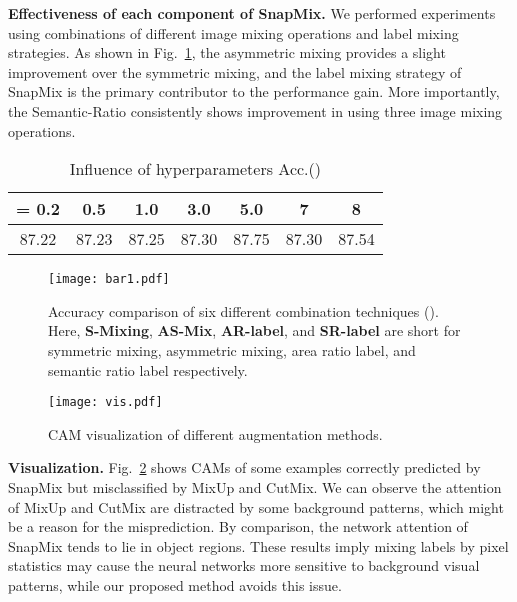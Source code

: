 \documentclass[letterpaper]{article} \usepackage{aaai21}  \usepackage{times}  \usepackage{helvet} \usepackage{courier}  \usepackage[hyphens]{url}  \usepackage{graphicx} \urlstyle{rm} \def\UrlFont{\rm}  \usepackage{natbib}  \usepackage{caption} \frenchspacing  \setlength{\pdfpagewidth}{8.5in}  \setlength{\pdfpageheight}{11in}
\begin{document}
\noindent\textbf{Effectiveness of each component of SnapMix.} We performed experiments using combinations of different image mixing operations and label mixing strategies. As shown in Fig.~\ref{fig:acc}, the asymmetric mixing provides a slight improvement over the symmetric mixing, and the label mixing strategy of SnapMix is the primary contributor to the performance gain. More importantly, the Semantic-Ratio consistently shows improvement in using three image mixing operations. 






  \begin{table}
\caption{Influence of hyperparameters Acc.()}
        \begin{center}
            \begin{tabular}{ccccccc}
            \toprule
            = 0.2&0.5 &1.0 &3.0 & 5.0 & 7&8  \\
             \midrule
             87.22 & 87.23& 87.25& 87.30&87.75 &87.30&87.54  \\
           
            
             \bottomrule
            
            
            \end{tabular}
\end{center}
        \label{table:influence}
\end{table}
  
  \begin{figure}[t]
  \begin{center}
    \texttt{[image: bar1.pdf]}
\end{center}
  \caption{Accuracy comparison of six different combination techniques (). Here, \textbf{S-Mixing}, \textbf{AS-Mix}, \textbf{AR-label}, and \textbf{SR-label}  are short for symmetric mixing, asymmetric mixing, area ratio label, and semantic ratio label respectively.}
  \label{fig:acc}
\end{figure}
  
  
  \begin{figure}[!]
  \begin{center}
    \texttt{[image: vis.pdf]}
  \end{center}
  \caption{CAM visualization of different augmentation methods.}
  \label{fig:vis}
  \vspace{-1em}
\end{figure}
  
  \noindent\textbf{Visualization.}
Fig.~\ref{fig:vis} shows CAMs of some examples correctly predicted by SnapMix but misclassified by MixUp and CutMix. We can observe the attention of MixUp and CutMix are distracted by some background patterns, which might be a reason for the misprediction. By comparison, the network attention of SnapMix tends to lie in object regions. These results imply mixing labels by pixel statistics may cause the neural networks more sensitive to background visual patterns, while our proposed method avoids this issue.
\end{document}
